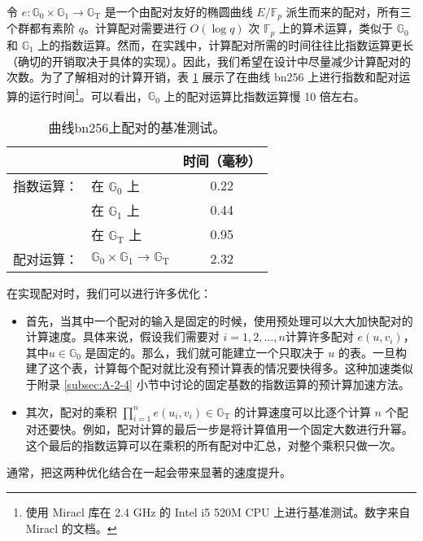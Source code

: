 \begin{snote}[配对的性能。]
令 $e:\mathbb{G}_0 \times \mathbb{G}_1 \to \mathbb{G}_\mathrm{T}$ 是一个由配对友好的椭圆曲线 $E/\mathbb{F}_p$ 派生而来的配对，所有三个群都有素阶 $q$。计算配对需要进行 $O(\log q)$ 次 $\mathbb{F}_p$ 上的算术运算，类似于 $\mathbb{G}_0$ 和 $\mathbb{G}_1$ 上的指数运算。然而，在实践中，计算配对所需的时间往往比指数运算更长（确切的开销取决于具体的实现）。因此，我们希望在设计中尽量减少计算配对的次数。为了了解相对的计算开销，表 \ref{tab:15-1} 展示了在曲线 bn256 上进行指数和配对运算的运行时间\footnote{使用 Miracl 库在 2.4 GHz 的 Intel i5 520M CPU 上进行基准测试。数字来自 Miracl 的文档。}。可以看出，$\mathbb{G}_0$ 上的配对运算比指数运算慢 10 倍左右。

\begin{table}[]
\centering
\begin{tabular}{|ll|c|}
\hline
\multicolumn{2}{|l|}{}               & 时间（毫秒） \\ \hline
指数运算： & 在 $\mathbb{G}_0$ 上      & 0.22      \\
         & 在 $\mathbb{G}_1$ 上      & 0.44      \\
         & 在 $\mathbb{G}_\mathrm{T}$ 上      & 0.95      \\ \hline
配对运算： & $\mathbb{G}_0\times\mathbb{G}_1\to\mathbb{G}_\mathrm{T}$ & 2.32      \\ \hline
\end{tabular}
\caption{曲线bn256上配对的基准测试。}
\label{tab:15-1}
\end{table}

在实现配对时，我们可以进行许多优化：
\begin{itemize}
	\item 首先，当其中一个配对的输入是固定的时候，使用预处理可以大大加快配对的计算速度。具体来说，假设我们需要对 $i=1,2,\dots,n$计算许多配对 $e(u,v_i)$，其中$u\in\mathbb{G}_0$ 是固定的。那么，我们就可能建立一个只取决于 $u$ 的表。一旦构建了这个表，计算每个配对就比没有预计算表的情况要快得多。这种加速类似于附录 \ref{subsec:A-2-4} 小节中讨论的固定基数的指数运算的预计算加速方法。
	\item 其次，配对的乘积 $\prod_{i=1}^ne(u_i,v_i)\in\mathbb{G}_\mathrm{T}$ 的计算速度可以比逐个计算 $n$ 个配对还要快。例如，配对计算的最后一步是将计算值用一个固定大数进行升幂。这个最后的指数运算可以在乘积的所有配对中汇总，对整个乘积只做一次。
\end{itemize}
通常，把这两种优化结合在一起会带来显著的速度提升。
\end{snote}